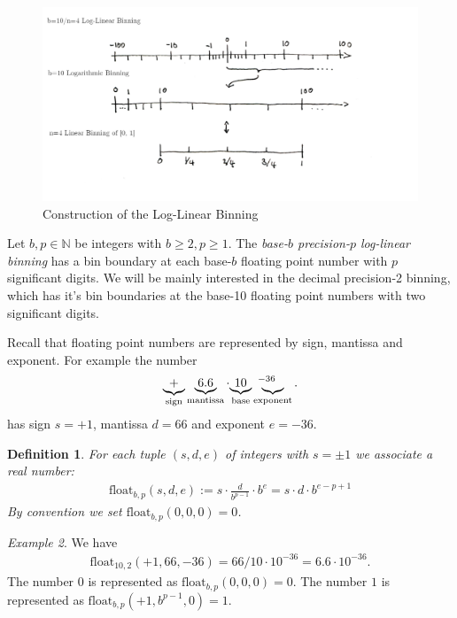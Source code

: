 \documentclass{article}
\theoremstyle{plain}
\newtheorem{definition}{Definition}[section]
\theoremstyle{remark}
\newtheorem{example}[definition]{Example}
\newcommand{\IN}{\mathbb{N}}
\newcommand{\defn}{\emph} %
\begin{document}
\begin{figure}
  \includegraphics[width=\textwidth]{assets/LLBins.png}
  \caption{Construction of the Log-Linear Binning}

\end{figure}


\newcommand{\float}{\mathrm{float}}
\newcommand{\bin}{\mathrm{bin}}

Let $b,p \in \IN$ be integers with $b\geq 2, p \geq 1$.
The \defn{base-$b$ precision-$p$ log-linear binning} has a bin boundary at each base-$b$ floating point number with $p$ significant digits.
We will be mainly interested in the decimal precision-2 binning, which has it's bin boundaries at the base-10 floating point numbers with two significant digits.

Recall that floating point numbers are represented by sign, mantissa and exponent.
For example the number
\begin{align*}
  \underbrace{+}_{\text{sign}} \underbrace{6.6}_{\text{mantissa}} \cdot {\underbrace{10}_{\text{base}}\hspace{.5em}}^{-36} \hspace{-2em}\underbrace{\hspace{.5em}}_{\text{exponent}}.
\end{align*}
has sign $s=+1$, mantissa $d=66$ and exponent $e=-36$.

\begin{definition}
  For each tuple $(s,d,e)$ of integers with $s=\pm1$ we associate a real number:
  \begin{align*}
    \float_{b,p}(s,d,e) := s \cdot \frac{d}{b^{p-1}} \cdot b^e = s \cdot d \cdot b^{e-p+1}
  \end{align*}
  By convention we set $\float_{b,p}(0,0,0)=0$.
\end{definition}

\begin{example}
  We have
  \begin{align*}
    \float_{10,2}(+1,66,-36) = 66/10 \cdot 10^{-36}  = 6.6 \cdot 10^{-36}.
  \end{align*}
  The number $0$ is represented as $\float_{b,p}(0,0,0) = 0$.
  The number $1$ is represented as $\float_{b,p}(+1,b^{p-1},0) = 1$.
\end{example}
\end{document}
